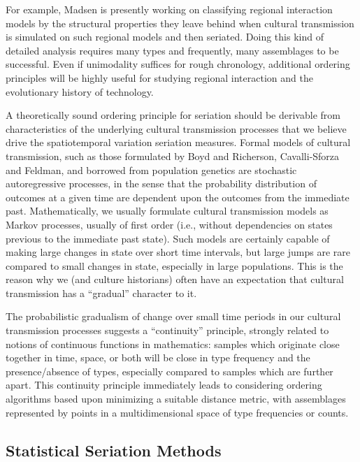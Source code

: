 \documentclass[graybox,natbib]{svmult}
\begin{document}
For example, Madsen \citeyearpar{madsenlipo2015b} is presently working
on classifying regional interaction models by the structural properties
they leave behind when cultural transmission is simulated on such
regional models and then seriated. Doing this kind of detailed analysis
requires many types and frequently, many assemblages to be successful.
Even if unimodality suffices for rough chronology, additional ordering
principles will be highly useful for studying regional interaction and
the evolutionary history of technology.

A theoretically sound ordering principle for seriation should be
derivable from characteristics of the underlying cultural transmission
processes that we believe drive the spatiotemporal variation seriation
measures. Formal models of cultural transmission, such as those
formulated by Boyd and Richerson, Cavalli-Sforza and Feldman, and
borrowed from population genetics
\citep{Boyd1985, Cavalli-Sforza1981, Neiman1995} are stochastic
autoregressive processes, in the sense that the probability distribution
of outcomes at a given time are dependent upon the outcomes from the
immediate past. Mathematically, we usually formulate cultural
transmission models as Markov processes, usually of first order (i.e.,
without dependencies on states previous to the immediate past state).
Such models are certainly capable of making large changes in state over
short time intervals, but large jumps are rare compared to small changes
in state, especially in large populations. This is the reason why we
(and culture historians) often have an expectation that cultural
transmission has a ``gradual'' character to it.

The probabilistic gradualism of change over small time periods in our
cultural transmission processes suggests a ``continuity'' principle,
strongly related to notions of continuous functions in mathematics:
samples which originate close together in time, space, or both will be
close in type frequency and the presence/absence of types, especially
compared to samples which are further apart. This continuity principle
immediately leads to considering ordering algorithms based upon
minimizing a suitable distance metric, with assemblages represented by
points in a multidimensional space of type frequencies or counts.

\subsection{Statistical Seriation
Methods}\label{statistical-seriation-methods}
\end{document}
